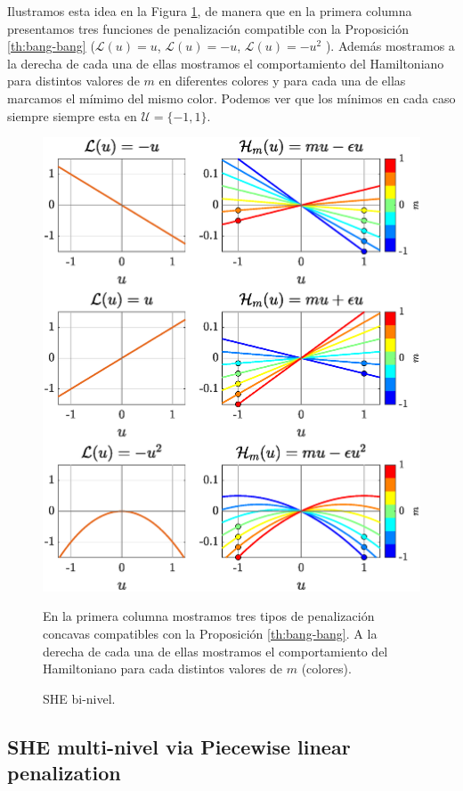 Ilustramos esta idea en la Figura \ref{fig:Bang-Bang-penalization}, de manera que en la primera columna presentamos tres funciones de penalización compatible con la Proposición \ref{th:bang-bang} ($\mathcal{L}(u) = u$, $\mathcal{L}(u) = -u$, $\mathcal{L}(u) = -u^2$ ). Además mostramos a la derecha de cada una de ellas mostramos el comportamiento del Hamiltoniano para distintos valores de $m$ en diferentes colores y para cada una de ellas marcamos el mímimo del mismo color. Podemos ver que los mínimos en cada caso siempre siempre esta en $\mathcal{U}= \{-1,1\}$.
\begin{figure} 
    \centering
    \includegraphics[scale=0.415]{img/fig03.eps}
    \caption{SHE bi-nivel.} \footnotesize En la primera columna mostramos tres tipos de penalización concavas compatibles con la Proposición \ref{th:bang-bang}. A la derecha de cada una de ellas mostramos el comportamiento del Hamiltoniano para cada distintos valores de $m$ (colores). 
    \footnotesize

    \label{fig:Bang-Bang-penalization}
\end{figure}
\subsection{SHE multi-nivel via Piecewise linear penalization}

